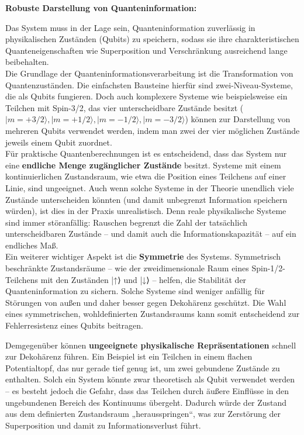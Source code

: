 \textbf{Robuste Darstellung von Quanteninformation:}

 Das System muss in der Lage sein, Quanteninformation zuverlässig in physikalischen Zuständen (Qubits) zu speichern, sodass sie ihre charakteristischen Quanteneigenschaften wie Superposition und Verschränkung ausreichend lange beibehalten. \\
 
Die Grundlage der Quanteninformationsverarbeitung ist die Transformation von Quantenzuständen. Die einfachsten Bausteine hierfür sind zwei-Niveau-Systeme, die als Qubits fungieren. Doch auch komplexere Systeme wie beispielsweise ein Teilchen mit Spin-3/2, das vier unterscheidbare Zustände besitzt ($|m = +3/2\rangle, |m = +1/2\rangle, |m = -1/2\rangle, |m = -3/2\rangle$) 
können zur Darstellung von mehreren Qubits verwendet werden, 
indem man zwei der vier möglichen Zustände jeweils einem Qubit zuordnet.\\

Für praktische Quantenberechnungen ist es entscheidend, dass das System nur eine \textbf{endliche Menge zugänglicher Zustände} besitzt. Systeme mit einem kontinuierlichen Zustandsraum, wie etwa die Position eines Teilchens auf einer Linie, sind ungeeignet. Auch wenn solche Systeme in der Theorie unendlich viele Zustände unterscheiden könnten (und damit unbegrenzt Information speichern würden), ist dies in der Praxis unrealistisch. Denn reale physikalische Systeme sind immer störanfällig: Rauschen begrenzt die Zahl der tatsächlich unterscheidbaren Zustände – und damit auch die Informationskapazität – auf ein endliches Maß.\\

Ein weiterer wichtiger Aspekt ist die \textbf{Symmetrie} des Systems. Symmetrisch beschränkte Zustandsräume – wie der zweidimensionale Raum eines Spin-1/2-Teilchens mit den Zuständen |↑⟩ und |↓⟩ – helfen, die Stabilität der Quanteninformation zu sichern. Solche Systeme sind weniger anfällig für Störungen von außen und daher besser gegen Dekohärenz geschützt. Die Wahl eines symmetrischen, wohldefinierten Zustandsraums kann somit entscheidend zur Fehlerresistenz eines Qubits beitragen.

Demgegenüber können \textbf{ungeeignete physikalische Repräsentationen} schnell zur Dekohärenz führen. Ein Beispiel ist ein Teilchen in einem flachen Potentialtopf, das nur gerade tief genug ist, um zwei gebundene Zustände zu enthalten. Solch ein System könnte zwar theoretisch als Qubit verwendet werden – es besteht jedoch die Gefahr, dass das Teilchen durch äußere Einflüsse in den ungebundenen Bereich des Kontinuums übergeht. Dadurch würde der Zustand aus dem definierten Zustandsraum „herausspringen“, was zur Zerstörung der Superposition und damit zu Informationsverlust führt.\\


